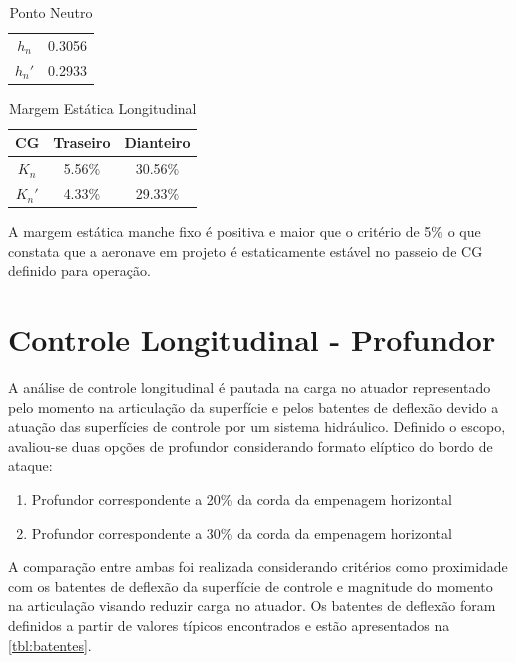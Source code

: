 \begin{table}[H]
\centering
\begin{tabular}{cc}
\toprule
$ h_n $ & 0.3056 \\
$ h_n' $ & 0.2933 \\
\bottomrule
\end{tabular}
\caption[Ponto Neutro]{Ponto Neutro}
\label{tbl:ponto_neutro}
\end{table}

\begin{table}[H]
\centering
\begin{tabular}{ccc}
\toprule
CG & Traseiro & Dianteiro \\ \midrule
$ K_n $ & 5.56\% & 30.56\% \\
$ K_n' $ & 4.33\% & 29.33\% \\
\bottomrule
\end{tabular}
\caption[Margem Estática Longitudinal]{Margem Estática Longitudinal}
\label{tbl:margem_estatica}
\end{table}

A margem estática manche fixo é positiva e maior que o critério de 5\% o que constata que a aeronave em projeto é estaticamente estável no passeio de CG definido para operação.

\section{Controle Longitudinal - Profundor}
\label{controlelongitudinal}

A análise de controle longitudinal é pautada na carga no atuador representado pelo momento na articulação da superfície e pelos batentes de deflexão devido a atuação das superfícies de controle por um sistema hidráulico. Definido o escopo, avaliou-se duas opções de profundor considerando formato elíptico do bordo de ataque:

\begin{enumerate}
\item Profundor correspondente a 20\% da corda da empenagem horizontal

\item Profundor correspondente a 30\% da corda da empenagem horizontal
\end{enumerate}

A comparação entre ambas foi realizada considerando critérios como proximidade com os batentes de deflexão da superfície de controle e magnitude do momento na articulação visando reduzir carga no atuador. Os batentes de deflexão foram definidos a partir de valores típicos encontrados e estão apresentados na \autoref{tbl:batentes}.

